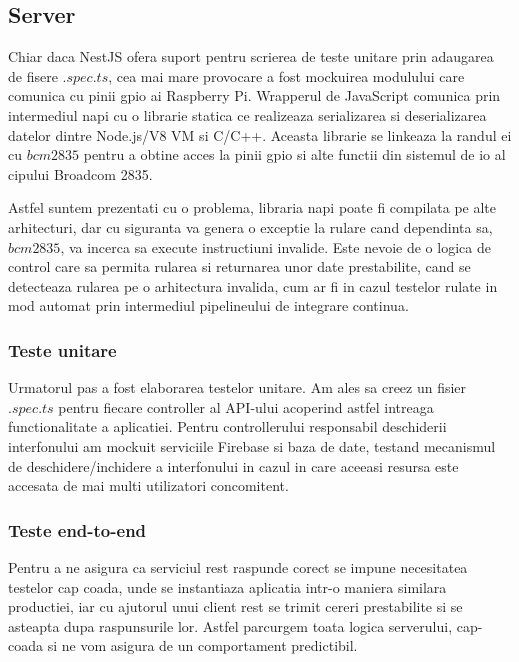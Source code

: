 \subsection {Server}

Chiar daca NestJS ofera suport pentru scrierea de teste unitare prin adaugarea de fisere $.spec.ts$, cea mai mare provocare a fost mockuirea modulului care comunica cu pinii \acrshort{gpio} ai Raspberry Pi. Wrapperul de JavaScript comunica prin intermediul \acrfull{napi} cu o librarie statica ce realizeaza serializarea si deserializarea datelor dintre Node.js/V8 VM si C/C++. Aceasta librarie se linkeaza la randul ei cu $bcm2835$ pentru a obtine acces la pinii \acrshort{gpio} si alte functii din sistemul de \acrfull{io} al cipului Broadcom 2835.

Astfel suntem prezentati cu o problema, libraria \acrshort{napi} poate fi compilata pe alte arhitecturi, dar cu siguranta va genera o exceptie la rulare cand dependinta sa, $bcm2835$, va incerca sa execute instructiuni invalide. Este nevoie de o logica de control care sa permita rularea si returnarea unor date prestabilite, cand se detecteaza rularea pe o arhitectura invalida, cum ar fi in cazul testelor rulate in mod automat prin intermediul pipelineului de integrare continua.

\subsubsection {Teste unitare}

Urmatorul pas a fost elaborarea testelor unitare. Am ales sa creez un fisier $.spec.ts$ pentru fiecare controller al API-ului acoperind astfel intreaga functionalitate a aplicatiei. Pentru controllerului responsabil deschiderii interfonului am mockuit serviciile Firebase si baza de date, testand mecanismul de deschidere/inchidere a interfonului in cazul in care aceeasi resursa este accesata de mai multi utilizatori concomitent.

\subsubsection {Teste end-to-end}

Pentru a ne asigura ca serviciul \acrshort{rest} raspunde corect se impune necesitatea testelor cap coada, unde se instantiaza aplicatia intr-o maniera similara productiei, iar cu ajutorul unui client rest se trimit cereri prestabilite si se asteapta dupa raspunsurile lor. Astfel parcurgem toata logica serverului, cap-coada si ne vom asigura de un comportament predictibil.

